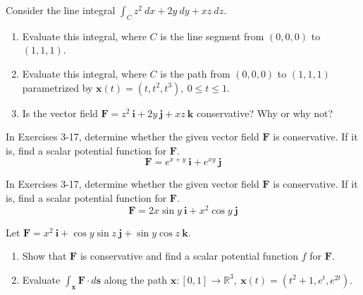\documentclass[12pt,letterpaper]{hmcpset}
\newcommand{\bb}[1]{\mathbb{#1}}
\renewcommand{\bf}[1]{\mathbf{#1}}
\begin{document}
\begin{problem}[Colley 6.3.1]
    Consider the line integral $\int_Cz^2~dx+2y~dy+xz~dz$.
    \begin{enumerate}
        \item Evaluate this integral, where $C$ is the line segment
            from $(0,0,0)$ to $(1,1,1)$.
        \item Evaluate this integral, where $C$ is the path from
            $(0,0,0)$ to $(1,1,1)$ parametrized by
            $\bf{x}(t)=(t,t^2,t^3),~0\leq t\leq1$.
        \item Is the vector field
            $\bf{F}=z^2~\bf{i}+2y~\bf{j}+xz~\bf{k}$ conservative? Why
            or why not?
    \end{enumerate}
\end{problem}
\begin{solution}
    \vfill
\end{solution}
\newpage

\begin{problem}[Colley 6.3.3]
    In Exercises 3-17, determine whether the given vector field
    $\bf{F}$ is conservative. If it is, find a scalar potential
    function for $\bf{F}$.
    \[
        \bf{F}=e^{x+y}~\bf{i}+e^{xy}~\bf{j}
    \]
\end{problem}
\begin{solution}
    \vfill
\end{solution}
\newpage

\begin{problem}[Colley 6.3.4]
    In Exercises 3-17, determine whether the given vector field
    $\bf{F}$ is conservative. If it is, find a scalar potential
    function for $\bf{F}$.
    \[
        \bf{F}=2x\sin y~\bf{i}+x^2\cos y~\bf{j}
    \]
\end{problem}
\begin{solution}
    \vfill
\end{solution}
\newpage

\begin{problem}[Colley 6.3.25]
    Let $\bf{F}=x^2~\bf{i}+\cos y\sin z~\bf{j}+\sin y\cos z~\bf{k}$.
    \begin{enumerate}
        \item Show that $\bf{F}$ is conservative and find a scalar
            potential function $f$ for $\bf{F}$.
        \item Evaluate $\int_{\bf{x}}\bf{F}\cdot d\bf{s}$ along the
            path $\bf{x}:[0,1]\to
            \bb{R}^3,~\bf{x}(t)=(t^2+1,e^t,e^{2t})$.
    \end{enumerate}
\end{problem}
\begin{solution}
    \vfill
\end{solution}
\newpage
\end{document}
